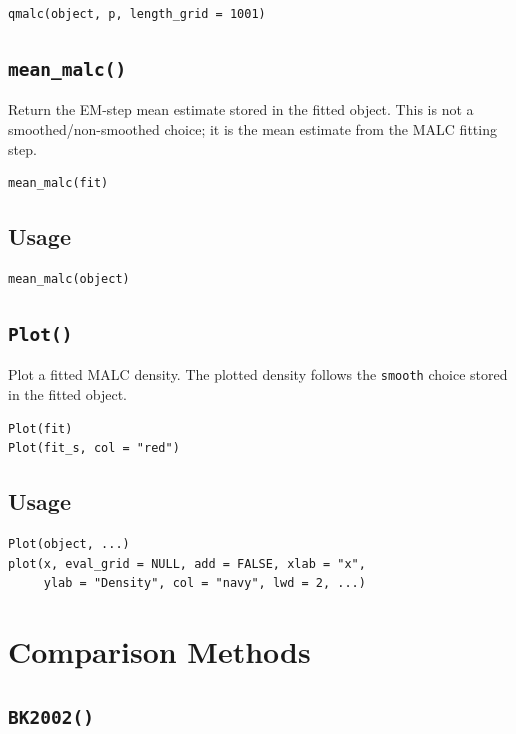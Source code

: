 \documentclass[11pt]{article}
\begin{document}
\begin{lstlisting}
qmalc(object, p, length_grid = 1001)
\end{lstlisting}

\subsection{\texttt{mean\_malc()}}

Return the EM-step mean estimate stored in the fitted object. This is not a
smoothed/non-smoothed choice; it is the mean estimate from the MALC fitting
step.

\begin{lstlisting}
mean_malc(fit)
\end{lstlisting}

\subsection*{Usage}

\begin{lstlisting}
mean_malc(object)
\end{lstlisting}

\subsection{\texttt{Plot()}}

Plot a fitted MALC density. The plotted density follows the \texttt{smooth}
choice stored in the fitted object.

\begin{lstlisting}
Plot(fit)
Plot(fit_s, col = "red")
\end{lstlisting}

\subsection*{Usage}

\begin{lstlisting}
Plot(object, ...)
plot(x, eval_grid = NULL, add = FALSE, xlab = "x",
     ylab = "Density", col = "navy", lwd = 2, ...)
\end{lstlisting}

\section{Comparison Methods}

\subsection{\texttt{BK2002()}}
\end{document}
